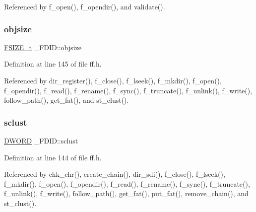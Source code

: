Referenced by f\+\_\+open(), f\+\_\+opendir(), and validate().

\mbox{\label{struct__FDID_a27039b8d89a4a62efabab36e6b303819}} 
\subsubsection{\texorpdfstring{objsize}{objsize}}
{\footnotesize\ttfamily \hyperlink{ff_8h_a3fc0992ad7436250b6b1a0592214b7f2}{F\+S\+I\+Z\+E\+\_\+t} \+\_\+\+F\+D\+I\+D\+::objsize}



Definition at line 145 of file ff.\+h.



Referenced by dir\+\_\+register(), f\+\_\+close(), f\+\_\+lseek(), f\+\_\+mkdir(), f\+\_\+open(), f\+\_\+opendir(), f\+\_\+read(), f\+\_\+rename(), f\+\_\+sync(), f\+\_\+truncate(), f\+\_\+unlink(), f\+\_\+write(), follow\+\_\+path(), get\+\_\+fat(), and st\+\_\+clust().

\mbox{\label{struct__FDID_ae2fbaaa31b5d12b333cb6d1ded099412}} 
\subsubsection{\texorpdfstring{sclust}{sclust}}
{\footnotesize\ttfamily \hyperlink{integer_8h_ad342ac907eb044443153a22f964bf0af}{D\+W\+O\+RD} \+\_\+\+F\+D\+I\+D\+::sclust}



Definition at line 144 of file ff.\+h.



Referenced by chk\+\_\+chr(), create\+\_\+chain(), dir\+\_\+sdi(), f\+\_\+close(), f\+\_\+lseek(), f\+\_\+mkdir(), f\+\_\+open(), f\+\_\+opendir(), f\+\_\+read(), f\+\_\+rename(), f\+\_\+sync(), f\+\_\+truncate(), f\+\_\+unlink(), f\+\_\+write(), follow\+\_\+path(), get\+\_\+fat(), put\+\_\+fat(), remove\+\_\+chain(), and st\+\_\+clust().

\mbox{\label{struct__FDID_a1a2ff09f2ef172772f4e7312070be708}} 
